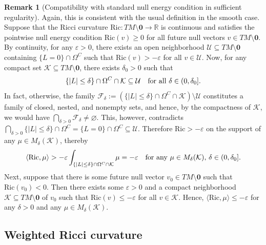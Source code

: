 \documentclass[a4paper,11pt]{article}
\numberwithin{equation}{section}
\theoremstyle{definition}
\newtheorem{Remark}[Definition]{Remark}
\theoremstyle{plain}
\newcommand{\R}{\mathbb R}
\newcommand{\eps}{\varepsilon}
\newcommand{\Ric}{\mathrm{Ric}}
\begin{document}
\begin{Remark}[Compatibility with standard null energy condition in sufficient regularity]
    Again, this is consistent with the usual definition in the smooth case. 
    Suppose that the Ricci curvature $\Ric : TM \setminus \mathbf{0} \rightarrow \R$ is continuous and satisfies the pointwise null energy condition $\Ric(v) \geq 0$ for all future null vectors $v \in TM \setminus \mathbf{0}$. 
    By continuity, for any $\eps >0$, there exists an open neighborhood $\mathcal{U} \subseteq TM \setminus \mathbf{0}$ containing $\{ L = 0\} \cap \Omega^C$ such that $\Ric(v) > - \eps$ for all $v \in \mathcal{U}$. 
    Now, for any compact set $\mathcal{K} \subseteq TM \setminus \mathbf{0}$, there exists $\delta_0 > 0$ such that 
    \begin{equation*}
        \{|L| \leq \delta\} \cap \Omega^C \cap \mathcal{K} \subseteq \mathcal{U} \quad \textnormal{for all } \delta \in (0,\delta_0].
    \end{equation*}
    In fact, otherwise, the family $\mathcal{F}_\delta:=(\{|L| \leq \delta\} \cap \Omega^C \cap \mathcal{K}) \setminus \mathcal{U}$ constitutes a family of closed, nested, and nonempty sets, and hence, by the compactness of $\mathcal{K}$, we would have $\bigcap_{\delta >0} \mathcal{F}_\delta \neq \varnothing$. 
    This, however, contradicts $\bigcap_{\delta > 0} \{|L| \leq \delta\} \cap \Omega^C = \{L=0\} \cap \Omega^C \subseteq \mathcal{U}$.
    Therefore $\Ric > - \eps$ on the support of any $\mu \in M_\delta(\mathcal{K})$, thereby
    \begin{equation*}
        \langle \Ric, \mu \rangle > - \eps \int_{\{|L| \leq \delta\} \cap \Omega^C \cap \mathcal{K}} \mu = -\eps \quad \textnormal{for any } \mu \in M_\delta(\mathcal{K}),\, \delta \in (0,\delta_0].
    \end{equation*}
    Next, suppose that there is some future null vector $v_0 \in TM \setminus \mathbf{0}$ such that $\Ric(v_0) < 0$. 
    Then there exists some $\eps >0$ and a compact neighborhood $\mathcal{K} \subseteq TM \setminus \mathbf{0}$ of $v_0$ such that $\Ric(v) \leq - \eps$ for all $v \in \mathcal{K}$. 
    Hence, $\langle \Ric, \mu \rangle \leq -\eps$ for any $\delta >0$ and any $\mu \in M_\delta(\mathcal{K})$.
\end{Remark}

\subsection{Weighted Ricci curvature}
\label{Subsection: weights}
\end{document}

